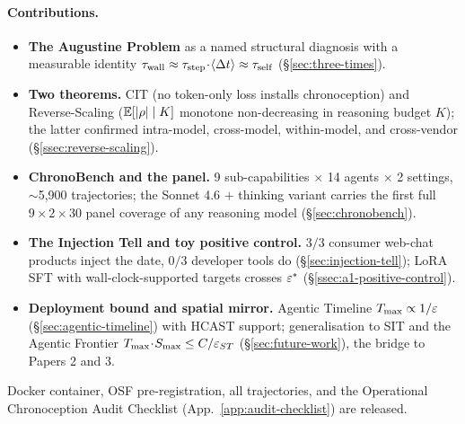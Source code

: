 \paragraph{Contributions.}
\begin{itemize}[leftmargin=1.4em, itemsep=1pt]
\item \textbf{The Augustine Problem} as a named structural diagnosis with a measurable identity $\tau_{\mathrm{wall}} \approx \tau_{\mathrm{step}}\!\cdot\!\langle\Delta t\rangle \approx \tau_{\mathrm{self}}$ (\S\ref{sec:three-times}).
\item \textbf{Two theorems.} CIT (no token-only loss installs chronoception) and Reverse-Scaling ($\mathbb{E}[|\rho|\mid K]$ monotone non-decreasing in reasoning budget $K$); the latter confirmed intra-model, cross-model, within-model, and cross-vendor (\S\ref{ssec:reverse-scaling}).
\item \textbf{ChronoBench and the panel.} 9 sub-capabilities $\times$ 14 agents $\times$ 2 settings, $\sim$5{,}900 trajectories; the Sonnet 4.6 $+$ thinking variant carries the first full $9\!\times\!2\!\times\!30$ panel coverage of any reasoning model (\S\ref{sec:chronobench}).
\item \textbf{The Injection Tell and toy positive control.} $3/3$ consumer web-chat products inject the date, $0/3$ developer tools do (\S\ref{sec:injection-tell}); LoRA SFT with wall-clock-supported targets crosses $\varepsilon^{*}$ (\S\ref{ssec:a1-positive-control}).
\item \textbf{Deployment bound and spatial mirror.} Agentic Timeline $T_{\max} \propto 1/\varepsilon$ (\S\ref{sec:agentic-timeline}) with HCAST support; generalisation to SIT and the Agentic Frontier $T_{\max}\!\cdot\!S_{\max} \leq C/\varepsilon_{ST}$ (\S\ref{sec:future-work}), the bridge to Papers 2 and 3.
\end{itemize}
Docker container, OSF pre-registration, all trajectories, and the Operational Chronoception Audit Checklist (App.~\ref{app:audit-checklist}) are released.
